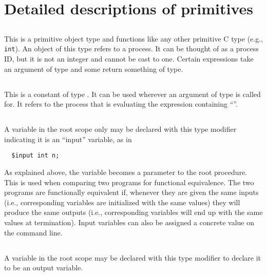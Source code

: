 \documentclass[11pt]{book}
\begin{document}
\section{Detailed descriptions of primitives}

\subsection{\cproc} This is a primitive object type and functions like
any other primitive C type (e.g., \texttt{int}).  An object of this
type refers to a process.  It can be thought of as a process ID, but
it is not an integer and cannot be cast to one.  Certain expressions
take an argument of \cproc{} type and some return something of
\cproc{} type.

\subsection{\cself} This is a constant of type \cproc.  It can be used
wherever an argument of type \cproc{} is called for.  It refers to the
process that is evaluating the expression containing ``\cself''.

\subsection{\cinput} A variable in the root scope only may be declared
with this type modifier indicating it is an ``input'' variable, as in
\begin{verbatim}
  $input int n;
\end{verbatim}
As explained above, the variable becomes a parameter to the root
procedure.  This is used when comparing two programs for functional
equivalence.  The two programs are functionally equivalent if,
whenever they are given the same inputs (i.e., corresponding \cinput{}
variables are initialized with the same values) they will produce the
same outputs (i.e., corresponding \coutput{} variables will end up
with the same values at termination).  Input variables can also be
assigned a concrete value on the command line.

\subsection{\coutput} A variable in the root scope may be declared
with this type modifier to declare it to be an output variable.
\end{document}
